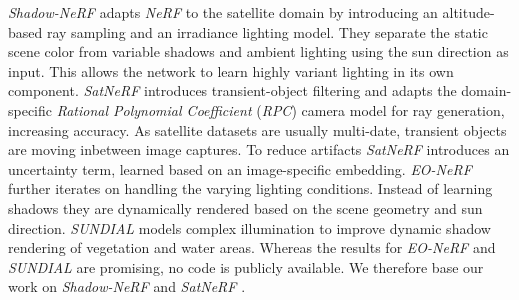 \emph{Shadow-NeRF} \cite{snerf} adapts \emph{NeRF} to the satellite domain by introducing an altitude-based ray sampling and an irradiance lighting model. They separate the static scene color from variable shadows and ambient lighting using the sun direction as input. This allows the network to learn highly variant lighting in its own component. 
\emph{SatNeRF} \cite{satnerf} introduces transient-object filtering and adapts the domain-specific \emph{Rational Polynomial Coefficient} (\emph{RPC}) \cite{rpc} camera model for ray generation, increasing accuracy. 
As satellite datasets are usually multi-date, transient objects are moving inbetween image captures. To reduce artifacts \emph{SatNeRF} \cite{satnerf} introduces an uncertainty term, learned based on an image-specific embedding. 
\emph{EO-NeRF} \cite{eonerf} further iterates on handling the varying lighting conditions. Instead of learning shadows they are dynamically rendered based on the scene geometry and sun direction.
\emph{SUNDIAL} \cite{sundial} models complex illumination to improve dynamic shadow rendering of vegetation and water areas.  
Whereas the results for \emph{EO-NeRF} \cite{eonerf} and \emph{SUNDIAL} \cite{sundial} are promising, no code is publicly available. 
We therefore base our work on \emph{Shadow-NeRF} \cite{snerf} and \emph{SatNeRF} \cite{satnerf}.

